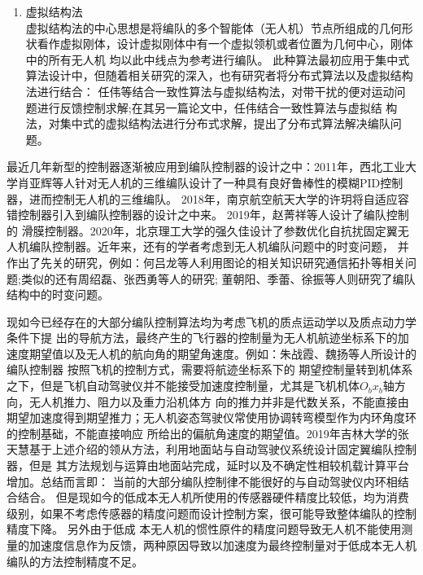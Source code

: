 \begin{enumerate}
    \item 虚拟结构法\\
        虚拟结构法的中心思想是将编队的多个智能体（无人机）节点所组成的几何形状看作虚拟刚体，设计虚拟刚体中有一个虚拟领机或者位置为几何中心，刚体中的所有无人机
        均以此中线点为参考进行编队。\cite{Lewis1997High}
        此种算法最初应用于集中式算法设计中，但随着相关研究的深入，也有研究者将分布式算法以及虚拟结构法进行结合：
        任伟等结合一致性算法与虚拟结构法，对带干扰的便对运动问题进行反馈控制求解\cite{Ren2004Formation};在其另一篇论文中，任伟结合一致性算法与虚拟结
        构法，对集中式的虚拟结构法进行分布式求解，提出了分布式算法解决编队问题。\cite{Ren2004Decentralized}
\end{enumerate}

最近几年新型的控制器逐渐被应用到编队控制器的设计之中：2011年，西北工业大学肖亚辉等人针对无人机的三维编队设计了一种具有良好鲁棒性的模糊PID控制器，进而控制无人机的三维编队。\cite{XiaoYaHui2011}
2018年，南京航空航天大学的许玥将自适应容错控制器引入到编队控制器的设计之中来。\cite{XuYue} 2019年，赵菁祥等人设计了编队控制的
滑膜控制器。2020年，北京理工大学的强久佳设计了参数优化自抗扰固定翼无人机编队控制器。\cite{MengXiuyun2020}近年来，还有的学者考虑到无人机编队问题中的时变问题，
并作出了先关的研究，例如：何吕龙等人利用图论的相关知识研究通信拓扑等相关问题\cite{Helvlong2020};类似的还有周绍磊\cite{Zhoushaolei2020}、张西勇\cite{Zhangxiyong2019}等人的研究;
董朝阳\cite{Dongzhaoyang2020}、季蕾\cite{Jilei2019}、徐振\cite{Xuzhen2019}等人则研究了编队结构中的时变问题。

现如今已经存在的大部分编队控制算法均为考虑飞机的质点运动学以及质点动力学条件下提
出的导航方法，最终产生的飞行器的控制量为无人机航迹坐标系下的加速度期望值以及无人机的航向角的期望角速度。例如：朱战霞、魏扬等人所设计的编队控制器
按照飞机的控制方式，需要将航迹坐标系下的
期望控制量转到机体系之下，但是飞机自动驾驶仪并不能接受加速度控制量，尤其是飞机机体$O_bx_b$轴方向，无人机推力、阻力以及重力沿机体方
向的推力并非是代数关系，不能直接由期望加速度得到期望推力；无人机姿态驾驶仪常使用协调转弯模型作为内环角度环的控制基础，不能直接响应
所给出的偏航角速度的期望值。2019年吉林大学的张天慧基于上述介绍的领从方法，利用地面站与自动驾驶仪系统设计固定翼编队控制器，\cite{Zhangtianhui2019}但是
其方法规划与运算由地面站完成，延时以及不确定性相较机载计算平台增加。总结而言即：
当前的大部分编队控制律不能很好的与自动驾驶仪内环相结合结合。
但是现如今的低成本无人机所使用的传感器硬件精度比较低，均为消费级别，如果不考虑传感器的精度问题而设计控制方案，很可能导致整体编队的控制精度下降。
另外由于低成
本无人机的惯性原件的精度问题导致无人机不能使用测量的加速度信息作为反馈，两种原因导致以加速度为最终控制量对于低成本无人机编队的方法控制精度不足。
